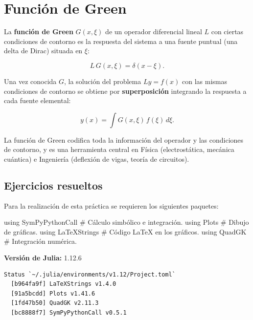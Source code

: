 \documentclass[
  spanish,
  a4paper,
]{scrreport}
\newenvironment{Shaded}{\begin{snugshade}}{\end{snugshade}}
\newcommand{\BuiltInTok}[1]{\textcolor[rgb]{0.00,0.23,0.31}{#1}}
\newcommand{\CommentTok}[1]{\textcolor[rgb]{0.37,0.37,0.37}{#1}}
\newcommand{\ImportTok}[1]{\textcolor[rgb]{0.00,0.46,0.62}{#1}}
\theoremstyle{definition}
\theoremstyle{remark}
\begin{document}

\chapter{Función de Green}\label{funciuxf3n-de-green}

La \textbf{función de Green} \(G(x, \xi)\) de un operador diferencial
lineal \(L\) con ciertas condiciones de contorno es la respuesta del
sistema a una fuente puntual (una delta de Dirac) situada en \(\xi\):

\[
L\,G(x, \xi) = \delta(x - \xi).
\]

Una vez conocida \(G\), la solución del problema \(Ly = f(x)\) con las
mismas condiciones de contorno se obtiene por \textbf{superposición}
integrando la respuesta a cada fuente elemental:

\[
y(x) = \int G(x, \xi)\,f(\xi)\,d\xi.
\]

La función de Green codifica toda la información del operador y las
condiciones de contorno, y es una herramienta central en Física
(electrostática, mecánica cuántica) e Ingeniería (deflexión de vigas,
teoría de circuitos).

\section{Ejercicios resueltos}\label{ejercicios-resueltos-8}

Para la realización de esta práctica se requieren los siguientes
paquetes:

\begin{Shaded}
\begin{Highlighting}[]
\ImportTok{using} \BuiltInTok{SymPyPythonCall}  \CommentTok{\# Cálculo simbólico e integración.}
\ImportTok{using} \BuiltInTok{Plots}            \CommentTok{\# Dibujo de gráficas.}
\ImportTok{using} \BuiltInTok{LaTeXStrings}     \CommentTok{\# Código LaTeX en los gráficos.}
\ImportTok{using} \BuiltInTok{QuadGK}           \CommentTok{\# Integración numérica.}
\end{Highlighting}
\end{Shaded}

\begin{tcolorbox}[enhanced jigsaw, arc=.35mm, bottomrule=.15mm, bottomtitle=1mm, breakable, colback=white, colbacktitle=quarto-callout-note-color!10!white, colframe=quarto-callout-note-color-frame, coltitle=black, left=2mm, leftrule=.75mm, opacityback=0, opacitybacktitle=0.6, rightrule=.15mm, title=\textcolor{quarto-callout-note-color}{\faInfo}\hspace{0.5em}{Versiones de Julia y de los paquetes utilizados}, titlerule=0mm, toprule=.15mm, toptitle=1mm]

\textbf{Versión de Julia:} 1.12.6

\begin{verbatim}
Status `~/.julia/environments/v1.12/Project.toml`
  [b964fa9f] LaTeXStrings v1.4.0
  [91a5bcdd] Plots v1.41.6
  [1fd47b50] QuadGK v2.11.3
  [bc8888f7] SymPyPythonCall v0.5.1
\end{verbatim}

\end{tcolorbox}
\end{document}
